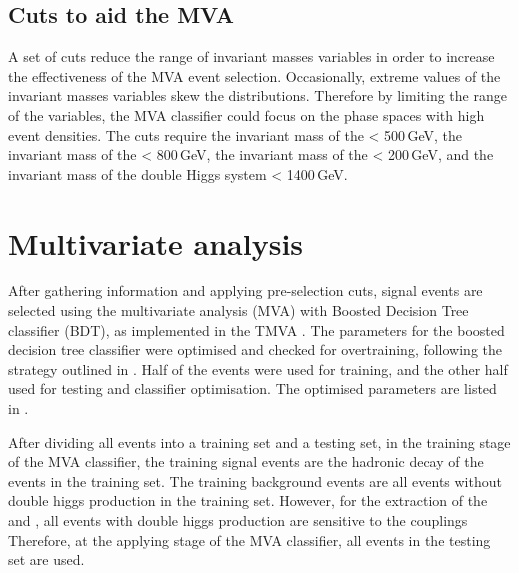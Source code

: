 \subsection{Cuts to aid the MVA}

A set of cuts reduce the range of invariant masses variables in order to increase the effectiveness of the MVA event selection. Occasionally, extreme values of the invariant masses variables skew the distributions. Therefore by limiting the range of the variables, the MVA classifier could focus on the phase spaces with high event densities. The cuts require the invariant mass of the \Hbb < 500\,GeV, the invariant mass of the \HWW < 800\,GeV, the invariant mass of the \PW < 200\,GeV, and the invariant mass of the double Higgs system < 1400\,GeV.



\section{Multivariate analysis}
\label{sec:doubleHiggsMVA}
After gathering information and applying  pre-selection cuts, signal events are selected using the multivariate analysis (MVA) with Boosted Decision Tree classifier (BDT), as implemented in the TMVA \cite{Hocker:2007ht}. The parameters for the boosted decision tree classifier were optimised and checked for overtraining, following the strategy outlined in . Half of the events were used for training, and the other half used for testing and classifier optimisation. The optimised parameters are listed in .

After dividing all events into a training set and a testing set, in the training stage of the MVA classifier, the training signal events are the  hadronic \WW decay of the \eeToHHbbWW events in the training set. The training background events are all events without double higgs production  in the training set. However, for the extraction of the \gHHH and \gWWHH,  all events with double higgs production are sensitive to the couplings Therefore, at the applying stage of the MVA classifier, all events in the testing set are used.



